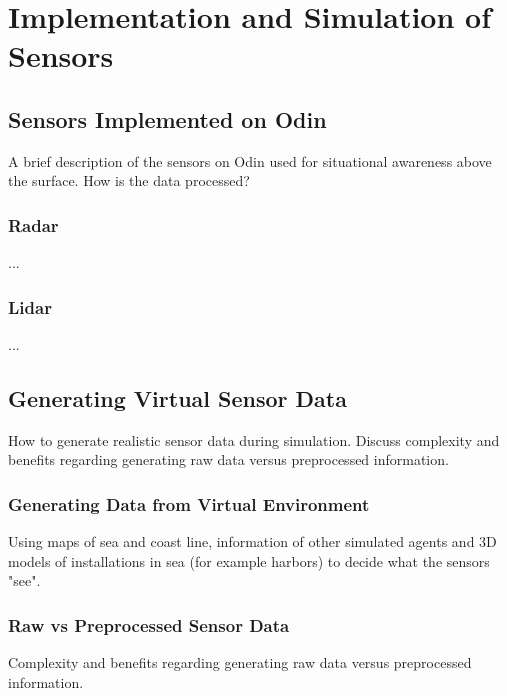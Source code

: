 \chapter{Implementation and Simulation of Sensors}

\section{Sensors Implemented on Odin}
A brief description of the sensors on Odin used for situational awareness above the surface. How is the data processed?
\subsection{Radar}
...
\subsection{Lidar}
...


\section{Generating Virtual Sensor Data}
How to generate realistic sensor data during simulation. Discuss complexity and benefits regarding generating raw data versus preprocessed information.

\subsection{Generating Data from Virtual Environment}
Using maps of sea and coast line, information of other simulated agents and 3D models of installations in sea (for example harbors) to decide what the sensors "see".

\subsection{Raw vs Preprocessed Sensor Data}
Complexity and benefits regarding generating raw data versus preprocessed information.
